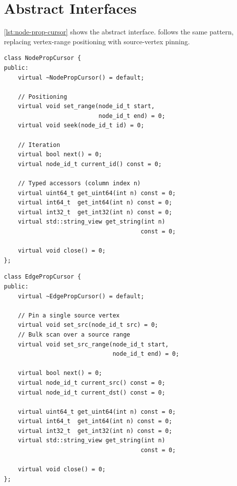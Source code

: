 \section{Abstract Interfaces}
\label{appendix:prop-cursor-interfaces}

\autoref{lst:node-prop-cursor} shows the  abstract interface.
 follows the same pattern, replacing vertex-range positioning with source-vertex pinning.

\begin{lstlisting}[style=cpp, label={lst:node-prop-cursor}, caption={\code{NodePropCursor} abstract interface (from \texttt{iterator.h}).}, captionpos=b]
class NodePropCursor {
public:
    virtual ~NodePropCursor() = default;

    // Positioning
    virtual void set_range(node_id_t start,
                           node_id_t end) = 0;
    virtual void seek(node_id_t id) = 0;

    // Iteration
    virtual bool next() = 0;
    virtual node_id_t current_id() const = 0;

    // Typed accessors (column index n)
    virtual uint64_t get_uint64(int n) const = 0;
    virtual int64_t  get_int64(int n) const = 0;
    virtual int32_t  get_int32(int n) const = 0;
    virtual std::string_view get_string(int n)
                                       const = 0;

    virtual void close() = 0;
};
\end{lstlisting}

\begin{lstlisting}[style=cpp, label={lst:edge-prop-cursor}, caption={\code{EdgePropCursor} abstract interface (from \texttt{iterator.h}).}, captionpos=b]
class EdgePropCursor {
public:
    virtual ~EdgePropCursor() = default;

    // Pin a single source vertex
    virtual void set_src(node_id_t src) = 0;
    // Bulk scan over a source range
    virtual void set_src_range(node_id_t start,
                               node_id_t end) = 0;

    virtual bool next() = 0;
    virtual node_id_t current_src() const = 0;
    virtual node_id_t current_dst() const = 0;

    virtual uint64_t get_uint64(int n) const = 0;
    virtual int64_t  get_int64(int n) const = 0;
    virtual int32_t  get_int32(int n) const = 0;
    virtual std::string_view get_string(int n)
                                       const = 0;

    virtual void close() = 0;
};
\end{lstlisting}

